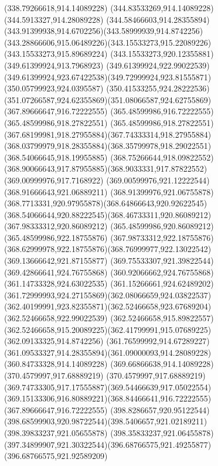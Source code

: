 {{{{				\lineto(338.79266618,914.14089228)
				\lineto(344.83533269,914.14089228)
				\lineto(344.5913327,914.28089228)
				\curveto(344.58466603,914.28355894)(343.91399938,914.6702256)(343.58999939,914.8742256)
				\curveto(343.28866606,915.06489226)(343.15533273,915.22089226)(343.15533273,915.89689224)
				\lineto(343.15533273,920.12355881)
				\lineto(349.61399924,913.7968923)
				\lineto(349.61399924,922.99022539)
				\curveto(349.61399924,923.67422538)(349.72999924,923.81555871)(350.05799923,924.0395587)
				\curveto(350.41533255,924.28222536)(351.07266587,924.62355869)(351.08066587,924.62755869)
				\closepath
				\moveto(367.89666647,916.72222555)
				\lineto(365.48599986,916.72222555)
				\lineto(365.48599986,918.27822551)
				\curveto(365.48599986,918.27822551)(367.68199981,918.27955884)(367.74333314,918.27955884)
				\curveto(368.03799979,918.28355884)(368.35799978,918.29022551)(368.54066645,918.19955885)
				\curveto(368.75266644,918.09822552)(368.90066643,917.87955885)(368.9033331,917.87822552)
				\lineto(369.00999976,917.7168922)
				\lineto(369.00599976,921.12222544)
				\lineto(368.91666643,921.06889211)
				\curveto(368.91399976,921.06755878)(368.7713331,920.97955878)(368.64866643,920.92622545)
				\curveto(368.54066644,920.88222545)(368.46733311,920.86089212)(367.98333312,920.86089212)
				\lineto(365.48599986,920.86089212)
				\lineto(365.48599986,922.18755876)
				\lineto(367.98733312,922.18755876)
				\curveto(368.62999978,922.18755876)(368.76999977,922.13022542)(369.13666642,921.87155877)
				\lineto(369.75533307,921.39822544)
				\lineto(369.42866641,924.76755868)
				\lineto(360.92066662,924.76755868)
				\lineto(361.14733328,924.63022535)
				\curveto(361.15266661,924.62489202)(361.72999993,924.27155869)(362.08066659,924.03822537)
				\curveto(362.40199991,923.82355871)(362.52466658,923.67689204)(362.52466658,922.99022539)
				\lineto(362.52466658,915.89822557)
				\curveto(362.52466658,915.20089225)(362.41799991,915.07689225)(362.09133325,914.8742256)
				\curveto(361.76599992,914.67289227)(361.09533327,914.28355894)(361.09000093,914.28089228)
				\lineto(360.84733328,914.14089228)
				\lineto(369.66866638,914.14089228)
				\lineto(370.4579997,917.68889219)
				\curveto(370.4579997,917.68889219)(369.74733305,917.17555887)(369.54466639,917.05022554)
				\curveto(369.15133306,916.80889221)(368.84466641,916.72222555)(367.89666647,916.72222555)
				\moveto(398.8286657,920.95122544)
				\curveto(398.68599903,920.98722544)(398.5406657,921.02189211)(398.39833237,921.05655878)
				\lineto(398.35833237,921.06455878)
				\curveto(397.34899907,921.30322544)(396.68766575,921.49255877)(396.68766575,921.92589209)
}}}}
